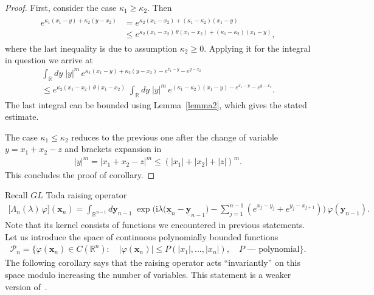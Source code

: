 \documentclass[11pt]{article}
\numberwithin{equation}{section}
\theoremstyle{plain}
\theoremstyle{definition}
\renewcommand{\phi}{\varphi}
\renewcommand{\imath}{\mathrm{i}}
\begin{document}
\begin{proof}
	First, consider the case $\kappa_1 \geq \kappa_2$. Then
	\begin{align}
		\begin{aligned}
			e^{\kappa_1(x_1 - y) + \kappa_2(y - x_2)} & = e^{\kappa_2(x_1 - x_2) + (\kappa_1 - \kappa_2) (x_1 - y)} \\[6pt]
			& \leq e^{\kappa_2(x_1 - x_2) \, \theta(x_1 - x_2) + (\kappa_1 - \kappa_2) (x_1 - y)},
		\end{aligned}
	\end{align}
	where the last inequality is due to assumption $\kappa_2 \geq 0$. Applying it for the integral in question we arrive at
	\begin{multline}
		\int_{\mathbb{R}} dy\; |y|^m \, e^{\kappa_1 (x_1 - y) + \kappa_2 (y - x_2) - e^{x_1 - y} - e^{y - x_2}} \\
		\leq e^{\kappa_2(x_1 - x_2) \, \theta(x_1 - x_2)} \; \int_{\mathbb{R}} dy\; |y|^m \, e^{(\kappa_1 - \kappa_2) (x_1 - y)- e^{x_1 - y} - e^{y - x_2}}.
	\end{multline}
	The last integral can be bounded using Lemma~\ref{lemma2}, which gives the stated estimate.
	
	The case $\kappa_1 \leq \kappa_2$ reduces to the previous one after the change of variable $y = x_1 + x_2 - z$ and brackets expansion in
	\begin{align}
		|y|^m = |x_1 + x_2 - z|^m \leq (|x_1| + |x_2| + |z|)^m.
	\end{align}
	This concludes the proof of corollary.
\end{proof}

Recall $GL$ Toda raising operator 
\begin{align} \label{L-def0}
	\bigl[ \Lambda_n(\lambda) \, \phi \bigr] (\bm{x}_n) = \int_{\mathbb{R}^{n - 1}} d\bm{y}_{n - 1} \; \exp \biggl( \imath \lambda \bigl( \underline{\bm{x}}_n - \underline{\bm{y}}_{n - 1} \bigr) - \sum_{j = 1}^{n - 1} ( e^{x_j - y_j} + e^{y_j - x_{j + 1} } ) \biggr) \, \phi(\bm{y}_{n - 1}).
\end{align}
Note that its kernel consists of functions we encountered in previous statements. Let us introduce the space of continuous polynomially bounded functions
\begin{align}
	\mathcal{P}_n= \bigl\{ \phi(\bm{x}_n) \in C(\mathbb{R}^n) \colon \quad  | \phi(\bm{x}_n) | \leq P(|x_1|, \dots, |x_n|), \quad \text{$P$ --- polynomial} \bigr\}.
\end{align}
The following corollary says that the raising operator acts ``invariantly'' on this space modulo increasing the number of variables. This statement is a weaker version of~\cite[Proposition 4.1.3]{BK}.
\end{document}
